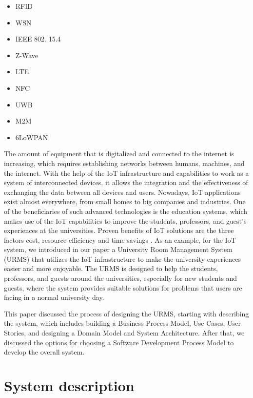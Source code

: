 \documentclass[conference,onecolumn]{IEEEtran}
\begin{document}
\begin{multicols}{2} %
	\begin{center}
		\begin{itemize}
			\item RFID
			\item WSN
			\item IEEE 802. 15.4
			\item Z-Wave
			\item LTE
			\item NFC
			\item UWB
			\item M2M
			\item 6LoWPAN	
		\end{itemize}
	\end{center}
\end{multicols}
	
The amount of equipment that is digitalized and connected to the internet is increasing, which requires establishing networks between humans, machines, and the internet. With the help of the IoT infrastructure and capabilities to work as a system of interconnected devices, it allows the integration and the effectiveness of exchanging the data between all devices and users. Nowadays, IoT applications exist almost everywhere, from small homes to big companies and industries. One of the beneficiaries of such advanced technologies is the education systems, which makes use of the IoT capabilities to improve the students, professors, and guest’s experiences at the universities. Proven benefits of IoT solutions are the three factors cost, resource efficiency and time savings \cite{a2}. As an example, for the IoT system, we introduced in our paper a University Room Management System (URMS) that utilizes the IoT infrastructure to make the university experiences easier and more enjoyable. The URMS is designed to help the students, professors, and guests around the universities, especially for new students and guests, where the system provides suitable solutions for problems that users are facing in a normal university day. 

This paper discussed the process of designing the URMS, starting with describing the system, which includes building a Business Process Model, Use Cases, User Stories, and designing a Domain Model and System Architecture. After that, we discussed the options for choosing a Software Development Process Model to develop the overall system. 


\section{System description}
\end{document}
